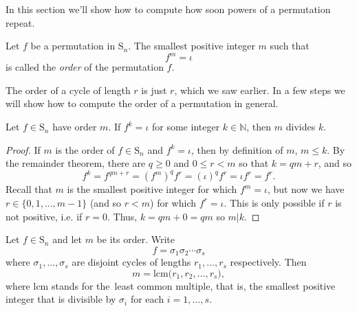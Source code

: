 \documentclass[11pt,dvipsnames]{book}
\numberwithin{equation}{section} %
\numberwithin{figure}{section} %
\numberwithin{table}{section} %
\begin{document}
In this section we'll show how to compute how soon powers of a permutation repeat. 

 \begin{definition}  Let $f$ be a permutation in $\mathrm{S}_n$.  The smallest positive integer
$m$ such that 
$$
f^m=\iota
$$
 is called the \emph{order} of the permutation $f$.
\end{definition}

The order of a cycle of length $r$ is just $r$, which we saw earlier. In a few steps we will show how to compute the order of a permutation in general. 

\begin{lemma}  Let $f\in\mathrm{S}_n$ have order $m$.   If $f^k=\iota$ for some integer $k\in\mathbb{N}$, then $m$ divides $k$.\end{lemma}

\begin{proof}
If $m$ is the order of $f\in\mathrm{S}_n$ and $f^k=\iota$, then by definition of $m$, $m\leq k$. By the remainder theorem, there are $q\geq 0$ and $0\leq r<m$ so that $k=qm+r$, and so
\[
f^{k} = f^{qm+r} = (f^{m})^{q} f^{r} = (\iota)^{q}f^{r} = \iota f^{r}= f^{r}.
\]
Recall that $m$ is the smallest positive integer for which $f^{m}=\iota$, but now we have $r\in \{0,1,...,m-1\}$ (and so $r<m$) for which $f^{r}=\iota$. This is only possible if $r$ is not positive, i.e. if $r=0$. Thus, $k=qm+0=qm$ so $m|k$.
\end{proof}



\begin{lemma}%
Let $f\in\mathrm{S}_n$ and let $m$ be its order. Write
$$
f=\sigma_{1}\sigma_{2}\cdots\sigma_{s}
$$
 where $\sigma_{1},\ldots,\sigma_{s}$ are disjoint cycles of
lengths $r_{1},\ldots,r_{s}$ respectively. Then 
$$
m=\mathrm{lcm}\big(r_{1},r_{2},\ldots,r_{s}\big),
$$
 where $\mathrm{lcm}$ stands for
\textcolor[rgb]{0.00,0.50,0.50}{the~least common multiple}, that is, the smallest positive integer that is divisible by $\sigma_{i}$ for each $i=1,...,s$.
\end{lemma}
\end{document}
